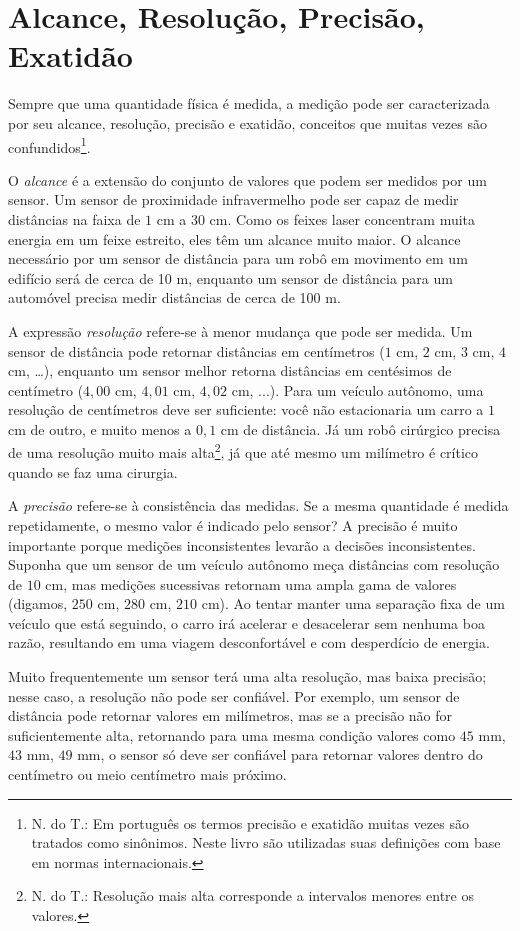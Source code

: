 \section{Alcance, Resolução, Precisão, Exatidão}\label{s.range}

Sempre que uma quantidade física é medida, a medição pode ser caracterizada por seu alcance, resolução, precisão e exatidão, conceitos que muitas vezes são confundidos\footnote{N. do T.: Em português os termos precisão e exatidão muitas vezes são tratados como sinônimos. Neste livro são utilizadas suas definições com base em normas internacionais.}.

O \emph{alcance} é a extensão do conjunto de valores que podem ser medidos por um sensor. Um sensor de proximidade infravermelho pode ser capaz de medir distâncias na faixa de $1$ cm a $30$ cm. Como os feixes laser concentram muita energia em um feixe estreito, eles têm um alcance muito maior. O alcance necessário por um sensor de distância para um robô em movimento em um edifício será de cerca de 10 m, enquanto um sensor de distância para um automóvel precisa medir distâncias de cerca de 100 m.

A expressão \emph{resolução} refere-se à menor mudança que pode ser medida. Um sensor de distância pode retornar distâncias em centímetros ($1$ cm, $2$ cm, $3$ cm, $4$ cm, \ldots), enquanto um sensor melhor retorna distâncias em centésimos de centímetro ($4,00$ cm, $4,01$ cm, $4,02$ cm, ...). Para um veículo autônomo, uma resolução de centímetros deve ser suficiente: você não estacionaria um carro a $1$ cm de outro, e muito menos a $0,1$ cm de distância. Já um robô cirúrgico precisa de uma resolução muito mais alta\footnote{N. do T.: Resolução mais alta corresponde a intervalos menores entre os valores.}, já que até mesmo um milímetro é crítico quando se faz uma cirurgia.

A \emph{precisão} refere-se à consistência das medidas. Se a mesma quantidade é medida repetidamente, o mesmo valor é indicado pelo sensor? A precisão é muito importante porque medições inconsistentes levarão a decisões inconsistentes. Suponha que um sensor de um veículo autônomo meça distâncias com resolução de $10$ cm, mas medições sucessivas retornam uma ampla gama de valores (digamos, $250$ cm, $280$ cm, $210$ cm). Ao tentar manter uma separação fixa de um veículo que está seguindo, o carro irá acelerar e desacelerar sem nenhuma boa razão, resultando em uma viagem desconfortável e com desperdício de energia.

Muito frequentemente um sensor terá uma alta resolução, mas baixa precisão; nesse caso, a resolução não pode ser confiável. Por exemplo, um sensor de distância pode retornar valores em milímetros, mas se a precisão não for suficientemente alta, retornando para uma mesma condição valores como $45$ mm, $43$ mm, $49$ mm, o sensor só deve ser confiável para retornar valores dentro do centímetro ou meio centímetro mais próximo.

